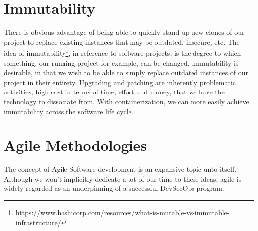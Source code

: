 \section{Immutability}

\justify
There is obvious advantage of being able to quickly stand up new clones
of our project to replace existing instances that may be outdated,
insecure, etc. The idea of immutability\footnote{\url{https://www.hashicorp.com/resources/what-is-mutable-vs-immutable-infrastructure/}},
in reference to software projects, is the degree to which something, our
running project for example, can be changed. Immutability is desirable,
in that we wish to be able to simply replace outdated instances of our
project in their entirety. Upgrading and patching are inherently
problematic activities, high cost in terms of time, effort and money,
that we have the technology to dissociate from. With containerization,
we can more easily achieve immutability across the software life cycle.

\section{Agile Methodologies}

\justify
The concept of Agile Software development is an expansive topic unto itself. Although we won't implicitly dedicate a lot of our time to these ideas, agile is widely regarded as an underpinning of a successful
DevSecOps program.